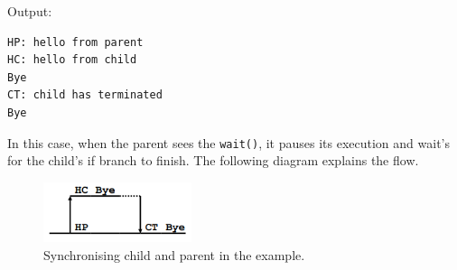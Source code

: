 \documentclass[a4paper]{article}
\begin{document}
\begin{exmp}
\textup{

}
\end{exmp}
Output:
\begin{verbatim}
HP: hello from parent
HC: hello from child
Bye
CT: child has terminated
Bye
\end{verbatim}
In this case, when the parent sees the \texttt{wait()}, it pauses its execution and wait's for the child's if branch to finish. The following diagram explains the flow.
\begin{figure}[H]
    \centering
    \includegraphics[height=1.75cm]{img/fork_sync_diagram.PNG}
    \caption{Synchronising child and parent in the example.}
\end{figure}








\newpage
\appendix




\newpage
\printbibliography
\end{document}
